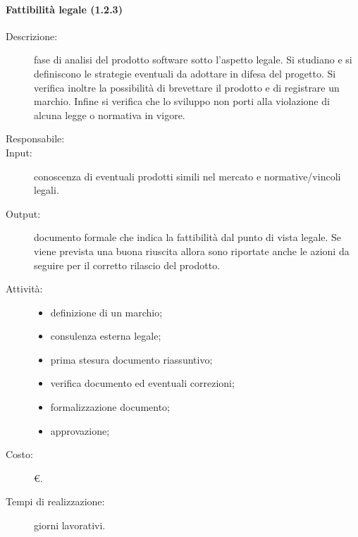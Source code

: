 \paragraph{Fattibilità legale (1.2.3)}
\begin{description}
\item[Descrizione:] fase di analisi del prodotto software sotto l'aspetto legale. Si studiano e si definiscono le strategie eventuali da adottare in difesa del progetto. Si verifica inoltre la possibilità di brevettare il prodotto e di registrare un marchio. Infine si verifica che lo sviluppo non porti alla violazione di alcuna legge o normativa in vigore.
\item[Responsabile:]
\item[Input:] conoscenza di eventuali prodotti simili nel mercato e normative/vincoli legali.
\item[Output:] documento formale che indica la fattibilità dal punto di vista legale. Se viene prevista una buona riuscita allora sono riportate anche le azioni da seguire per il corretto rilascio del prodotto.
\item[Attività:]
\begin{itemize}
\item definizione di un marchio;
\item consulenza esterna legale;
\item prima stesura documento riassuntivo;
\item verifica documento ed eventuali correzioni;
\item formalizzazione documento;
\item approvazione;
\end{itemize}
\item[Costo:] \euro{}.
\item[Tempi di realizzazione:]  giorni lavorativi.
\end{description}

